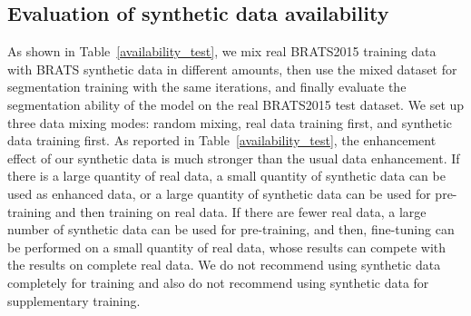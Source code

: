 \documentclass[runningheads]{llncs}
\begin{document}
\subsection{Evaluation of synthetic data availability}
As shown in Table~\ref{availability_test}, we mix real BRATS2015 training data with BRATS synthetic data in different amounts, then use the mixed dataset for segmentation training with the same iterations, and finally evaluate the segmentation ability of the model on the real BRATS2015 test dataset. We set up three data mixing modes: random mixing, real data training first, and synthetic data training first. As reported in Table~\ref{availability_test}, the enhancement effect of our synthetic data is much stronger than the usual data enhancement. If there is a large quantity of real data, a small quantity of synthetic data can be used as enhanced data, or a large quantity of synthetic data can be used for pre-training and then training on real data. If there are fewer real data, a large number of synthetic data can be used for pre-training, and then, fine-tuning can be performed on a small quantity of real data, whose results can compete with the results on complete real data.  We do not recommend using synthetic data completely for training and also do not recommend using synthetic data for supplementary training.
\end{document}
